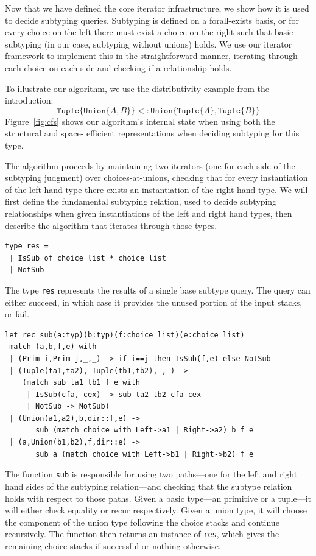 \documentclass[a4paper,english]{lipics-v2019}
\newcommand{\xt}[1]{\texttt{#1}}
\newcommand{\union}[2]{\xt{Union\{}#1,#2\xt{\}}}
\newcommand{\tuple}[1]{\xt{Tuple\{}#1\xt{\}}}
\begin{document}
Now that we have defined the core iterator infrastructure, we show how it
is used to decide subtyping queries. Subtyping is defined on a forall-exists
basis, or for every choice on the left there must exist a choice on the right
such that basic subtyping (in our case, subtyping without unions) holds. We
use our iterator framework to implement this in the straightforward manner, 
iterating through each choice on each side and checking if a relationship holds.

To illustrate our algorithm, we use the  distributivity example from the
introduction: $$\tuple{\union{A}{B}} <: \union{\tuple{A}}{\tuple{B}}$$
Figure~\ref{fig:cfs} shows our algorithm's internal state when using  both the
structural and space- efficient representations when deciding subtyping for
this type.

The algorithm proceeds by maintaining two iterators (one for each side of
the subtyping judgment) over choices-at-unions, checking that for every
instantiation of the left hand type there exists an instantiation of the
right hand type. We will first define the fundamental subtyping relation,
used to decide subtyping relationships when given instantiations of the left
and right hand types, then describe the algorithm that iterates through
those types.

\begin{lstlisting}
type res =
 | IsSub of choice list * choice list
 | NotSub
\end{lstlisting}

The type \verb|res| represents the results of a single base subtype
query. The query can either succeed, in which case it provides the unused
portion of the input stacks, or fail.

\begin{lstlisting}
let rec sub(a:typ)(b:typ)(f:choice list)(e:choice list)
 match (a,b,f,e) with
 | (Prim i,Prim j,_,_) -> if i==j then IsSub(f,e) else NotSub
 | (Tuple(ta1,ta2), Tuple(tb1,tb2),_,_) ->
    (match sub ta1 tb1 f e with
     | IsSub(cfa, cex) -> sub ta2 tb2 cfa cex
     | NotSub -> NotSub)
 | (Union(a1,a2),b,dir::f,e) -> 
       sub (match choice with Left->a1 | Right->a2) b f e
 | (a,Union(b1,b2),f,dir::e) -> 
       sub a (match choice with Left->b1 | Right->b2) f e
\end{lstlisting}


The function \verb|sub| is responsible for using two
paths---one for the left and right hand sides of the subtyping
relation---and checking that the subtype relation holds with respect
to those paths. Given a basic type---an primitive or a tuple---it will
either check equality or recur respectively. Given a union type, it
will choose the component of the union type following the choice
stacks and continue recursively. The function then returns an instance
of \verb|res|, which gives the remaining choice stacks if
successful or nothing otherwise.
\end{document}
